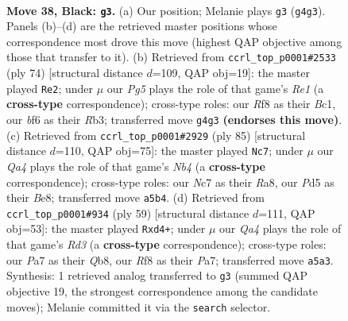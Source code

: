 \documentclass[11pt]{article}
\begin{document}
\clearpage

\begin{figure}[p]\centering
\begin{subfigure}{0.46\textwidth}\centering
\resizebox{\linewidth}{!}{%
\newchessgame
\chessboard[
  setfen={1rb2r2/p1n2p1k/1pB2Bp1/q2p4/6pP/NP6/R1PNQP2/R5K1 b - - 3 38},
  showmover=false,
  pgfstyle=straightmove, color=movearrow, markmove={g4-g3}
]}
\caption{}
\end{subfigure}\hfill
\begin{subfigure}{0.46\textwidth}\centering
\resizebox{\linewidth}{!}{%
\newchessgame
\chessboard[
  setfen={4r1k1/4rpp1/1b5p/pP1p3q/2nN4/1RPQPPP1/6KP/2B1R3 w - - 5 38},
  showmover=false,
  pgfstyle=straightmove, color=movearrow, markmove={e1-e2}
]}
\caption{}
\end{subfigure}
\\[4pt]
\begin{subfigure}{0.46\textwidth}\centering
\resizebox{\linewidth}{!}{%
\newchessgame
\chessboard[
  setfen={r3b1k1/5p1p/p2r1qp1/1n1p4/1PpN4/P3P2P/2BR1PP1/Q2R2K1 b - - 41 43},
  showmover=false,
  pgfstyle=straightmove, color=movearrow, markmove={b5-c7}
]}
\caption{}
\end{subfigure}\hfill
\begin{subfigure}{0.46\textwidth}\centering
\resizebox{\linewidth}{!}{%
\newchessgame
\chessboard[
  setfen={1q6/pb2rpk1/1p1rpn1p/6p1/1PPN4/4Q3/PB2BPPK/R2R4 b - - 0 30},
  showmover=false,
  pgfstyle=straightmove, color=movearrow, markmove={d6-d4}
]}
\caption{}
\end{subfigure}
\caption{\textbf{Move 38, Black: \texttt{g3}.} (a) Our position; Melanie plays \texttt{g3} (\texttt{g4g3}). Panels (b)--(d) are the retrieved master positions whose correspondence most drove this move (highest QAP objective among those that transfer to it). (b) Retrieved from \texttt{ccrl\_top\_p0001\#2533} (ply 74) [structural distance $d$=109, QAP obj=19]: the master played \texttt{Re2}; under $\mu$ our \emph{Pg5} plays the role of that game's \emph{Re1} (a \textbf{cross-type} correspondence); cross-type roles: our \emph{R}f8 as their \emph{B}c1, our \emph{b}f6 as their \emph{R}b3; transferred move \texttt{g4g3} \textbf{(endorses this move)}. (c) Retrieved from \texttt{ccrl\_top\_p0001\#2929} (ply 85) [structural distance $d$=110, QAP obj=75]: the master played \texttt{Nc7}; under $\mu$ our \emph{Qa4} plays the role of that game's \emph{Nb4} (a \textbf{cross-type} correspondence); cross-type roles: our \emph{N}c7 as their \emph{R}a8, our \emph{P}d5 as their \emph{B}e8; transferred move \texttt{a5b4}. (d) Retrieved from \texttt{ccrl\_top\_p0001\#934} (ply 59) [structural distance $d$=111, QAP obj=53]: the master played \texttt{Rxd4+}; under $\mu$ our \emph{Qa4} plays the role of that game's \emph{Rd3} (a \textbf{cross-type} correspondence); cross-type roles: our \emph{P}a7 as their \emph{Q}b8, our \emph{R}f8 as their \emph{P}a7; transferred move \texttt{a5a3}. Synthesis: 1 retrieved analog transferred to \texttt{g3} (summed QAP objective 19, the strongest correspondence among the candidate moves); Melanie committed it via the \texttt{search} selector.}
\label{fig:thought-m75}
\end{figure}
\end{document}
